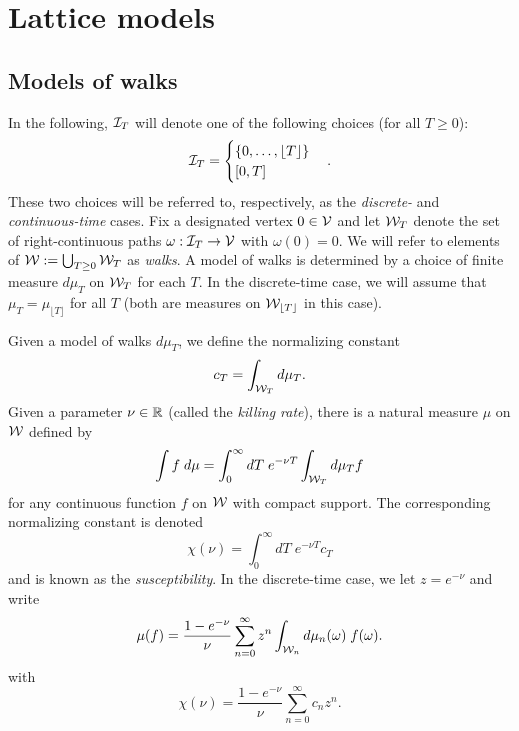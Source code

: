 \section{Lattice models}



\subsection{Models of walks}

In the following, $\mathcal{I}_T$ will denote one of the following choices (for all $T \ge 0$):
\begin{equation}
\mathcal{I}_T
  =
\begin{cases}
\{ 0, \ldots, \lfloor T \rfloor \} \\
[0, T]
\end{cases}.
\end{equation}
These two choices will be referred to, respectively, as the \emph{discrete-} and
\emph{continuous-time} cases.
Fix a designated vertex $0 \in \mathcal{V}$ and
let $\mathcal{W}_T$ denote the set of
right-continuous paths $\omega : \mathcal{I}_T \rightarrow \mathcal{V}$ with $\omega(0) = 0$.
We will refer to elements of $\mathcal{W} := \bigcup_{T \geq 0} \mathcal{W}_T$ as \emph{walks}.
A model of walks is determined by a choice of finite measure $d\mu_T$ on
$\mathcal{W}_T$ for each $T$.
In the discrete-time case, we will assume that
$\mu_T = \mu_{\lfloor T \rfloor}$ for all $T$ (both are measures on
$\mathcal{W}_{\lfloor T \rfloor}$ in this case).

Given a model of walks $d\mu_T$, we define the normalizing constant
\begin{equation}
c_T = \int_{\mathcal{W}_T} d\mu_T.
\end{equation}
Given a parameter $\nu \in {\mathbb R}$ (called the \emph{killing rate}),
there is a natural measure $\mu$ on $\mathcal{W}$ defined by
\begin{equation}
\int f \; d\mu
  =
\int_0^\infty dT \; e^{-\nu T} \int_{\mathcal{W}_T} d\mu_T f
\end{equation}
for any continuous function $f$ on $\mathcal{W}$ with compact support.
The corresponding normalizing constant is denoted
\begin{equation}
\chi(\nu) = \int_0^\infty dT \; e^{-\nu T} c_T
\end{equation}
and is known as the \emph{susceptibility}. In the discrete-time case,
we let $z = e^{-\nu}$ and write
\begin{equation}
\mu(f)
  =
\frac{1 - e^{-\nu}}{\nu} \sum_{n=0}^\infty z^n \int_{\mathcal{W}_n} d\mu_n(\omega) \; f(\omega).
\end{equation}
with
\begin{equation}
\chi(\nu) = \frac{1 - e^{-\nu}}{\nu} \sum_{n=0}^\infty c_n z^n.
\end{equation}

